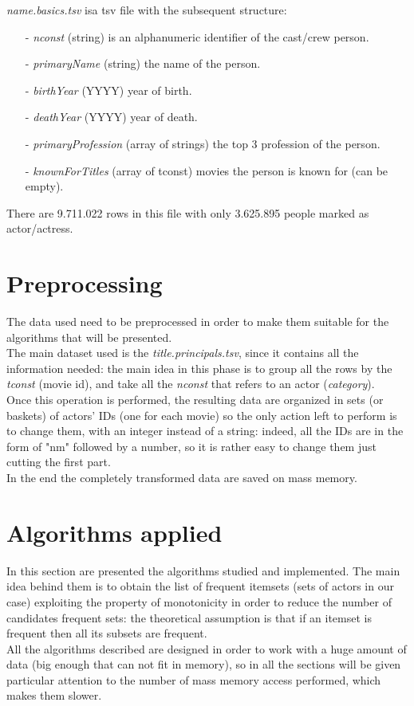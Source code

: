 \documentclass[14pt]{extarticle}
\begin{document}
\noindent
{\it name.basics.tsv} isa  tsv file with the subsequent structure:
\begin{itemize}[leftmargin=*]
\vspace{-0.4cm}\item[-]{\it nconst } (string) is an alphanumeric identifier of the cast/crew person.
\vspace{-1.1cm}\item[-]{\it primaryName } (string) the name of the person.
\vspace{-0.4cm}\item[-]{\it birthYear } (YYYY) year of birth.
\vspace{-0.4cm}\item[-]{\it deathYear  } (YYYY) year of death.
\vspace{-0.4cm}\item[-]{\it primaryProfession } (array of strings) the top 3 profession of the person.
\vspace{-1.0cm}\item[-]{\it knownForTitles  } (array of tconst) movies the person is known for (can be empty).
\end{itemize}
There are 9.711.022 rows in this file with only 3.625.895 people marked as actor/actress.
\section{Preprocessing}
The data used need to be preprocessed in order to make them suitable for the algorithms that will be presented.\\
The main dataset used is the {\it title.principals.tsv}, since it contains all the information needed: the main idea in this phase is to group all the rows by the {\it tconst} (movie id), and take all the {\it nconst} that refers to an actor ({\it category}).\\
Once this operation is performed, the resulting data are organized in sets (or baskets) of actors' IDs (one for each movie) so the only action left to perform is to change them, with an integer instead of a string: indeed, all the IDs are in the form of "nm" followed by a number, so it is rather easy to change them just cutting the first part.\\
In the end the completely transformed data are saved on mass memory.\\

\section{Algorithms applied}
In this section are presented the algorithms studied and implemented. The main idea behind them is to obtain the list of frequent itemsets (sets of actors in our case) exploiting the property of monotonicity in order to reduce  the number of candidates frequent sets: the theoretical assumption is that if an itemset is frequent then all its subsets are frequent.\\
All the algorithms described are designed in order to work with a huge amount of data (big enough that can not fit in memory), so in all the sections will be given particular attention to the number of mass memory access performed, which makes them slower.
\end{document}
